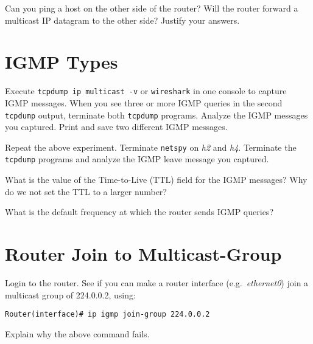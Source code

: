 \documentclass{../UTNetLab}
\begin{document}
    \begin{report}
        \item Can you ping a host on the other side of the router?
            Will the router forward a multicast IP datagram to the other side?
            Justify your answers.
    \end{report}

\section{IGMP Types}
    Execute \lstinline{tcpdump ip multicast -v} or \lstinline{wireshark} in one console to capture IGMP messages.
    When you see three or more IGMP queries in the second \lstinline{tcpdump} output, terminate both \lstinline{tcpdump} programs.
    Analyze the IGMP messages you captured.
    Print and save two different IGMP messages.

    Repeat the above experiment.
    Terminate \lstinline{netspy} on \textit{h2} and \textit{h4}.
    Terminate the \lstinline{tcpdump} programs and analyze the IGMP leave message you captured.
    
    \begin{report}
        \item What is the value of the Time-to-Live (TTL) field for the IGMP messages?
            Why do we not set the TTL to a larger number?

        \item What is the default frequency at which the router sends IGMP queries?
    \end{report}

\section{Router Join to Multicast-Group}
    Login to the router.
    See if you can make a router interface (e.g.\ \textit{ethernet0}) join a multicast group of 224.0.0.2, using:
    \begin{lstlisting}[language={cisco}]
Router(interface)# ip igmp join-group 224.0.0.2
    \end{lstlisting}
    
    \begin{report}
        \item Explain why the above command fails.
    \end{report}
\end{document}
